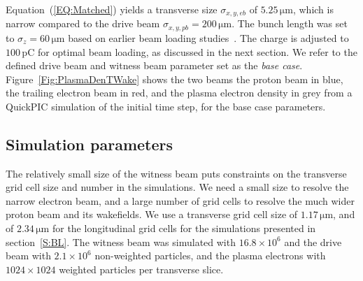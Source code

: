 \documentclass[aps,prstab,reprint,amsmath,amssymb,groupedaddress]{revtex4-1}
\newcommand{\unit}[1]{\,\mathrm{#1}}
\newcommand{\nexp}[1]{\times 10^{#1}}
\begin{document}
Equation~(\ref{EQ:Matched}) yields a transverse size $\sigma_{x,y,eb}$ of $5.25\unit{\mu m}$, which is narrow compared to the drive beam $\sigma_{x,y,pb} = 200\unit{\mu m}$. The bunch length was set to $\sigma_{z} = 60\unit{\mu m}$ based on earlier beam loading studies~\cite{berglyd_olsen:2016}. The charge is adjusted to $100\unit{pC}$ for optimal beam loading, as discussed in the next section. We refer to the defined drive beam and witness beam parameter set as the \emph{base case}. Figure~\ref{Fig:PlasmaDenTWake} shows the two beams \textendash the proton beam in blue, the trailing electron beam in red, and the plasma electron density in grey \textendash from a QuickPIC simulation of the initial time step, for the base case parameters.

\subsection{Simulation parameters}\label{SIM}

The relatively small size of the witness beam puts constraints on the transverse grid cell size and number in the simulations. We need a small size to resolve the narrow electron beam, and a large number of grid cells to resolve the much wider proton beam and its wakefields. We use a transverse grid cell size of $1.17\unit{\mu m}$, and of $2.34\unit{\mu m}$ for the longitudinal grid cells for the simulations presented in section~\ref{S:BL}. The witness beam was simulated with $16.8\nexp{6}$ and the drive beam with $2.1\nexp{6}$ non-weighted particles, and the plasma electrons with $1024 \times 1024$ weighted particles per transverse slice.
\end{document}
